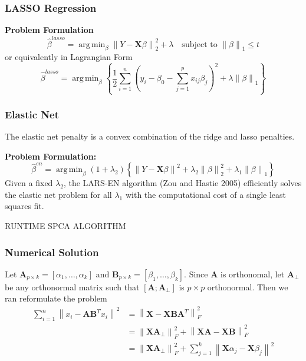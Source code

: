 \documentclass{beamer}
\theoremstyle{plain}
\theoremstyle{definition}
\newcommand{\mat}[1]{\mathbf{#1}}
\DeclareMathOperator*{\argmin}{arg\,min}
\newcommand{\norm}[1]{\left\lVert #1 \right\rVert}
\begin{document}
\begin{frame}
\frametitle{LASSO Regression}
\textbf{Problem Formulation}
$$\hat{\beta}^{lasso} = \argmin_{\beta} \norm{Y - \mat{X}\beta}_{2}^{2} + \lambda \quad \text{subject to } \norm{\beta}_{1} \leq t$$
or equivalently in Lagrangian Form
$$\hat{\beta}^{lasso} = \argmin_{\beta}\left\{\frac{1}{2}\sum_{i=1}^n (y_i - \beta_0 - \sum_{j=1}^p x_{ij}\beta_j)^2 + \lambda\norm{\beta}_{1} \right\}$$
\end{frame}

\begin{frame}
\frametitle{Elastic Net}
The elastic net penalty is a convex combination of the ridge and lasso penalties.\linebreak

\textbf{Problem Formulation:}
$$\hat{\beta}^{en} = \argmin_{\beta} (1 + \lambda_2) \left\{\norm{Y - \mat X \beta}^2 + \lambda_2 \norm{\beta}_{2}^2 + \lambda_1 \norm{\beta}_{1} \right\}$$
Given a fixed $\lambda_2$, the LARS-EN algorithm (Zou and Hastie 2005) efficiently solves the elastic net problem for all $\lambda_1$
with the computational cost of a single least squares fit.
\end{frame}

\begin{frame}
RUNTIME SPCA ALGORITHM
\end{frame}

\begin{frame}
\frametitle{Numerical Solution}
Let $\mat{A}_{p \times k} = \left[ \alpha_1, \ldots , \alpha_k\right]$ and $\mat{B}_{p \times k} = \left[ \beta_1, \ldots , \beta_k\right]$. Since $\mat A$ is orthonomal, let $\mat A_{\perp}$ be any orthonormal matrix such that $\left[ \mat A ; \mat A_{\perp} \right]$ is $p \times p$ orthonormal. Then we ran reformulate the problem
\begin{align*}
\sum_{i=1}^{n} \norm{x_i - \mat{A}\mat{B}^Tx_i}^2 & = \norm{\mat{X} - \mat{X} \mat{B} \mat{A}^T}_F^2\\
& = \norm{\mat X \mat A_{\perp}}_F^2 + \norm{\mat X \mat A - \mat X \mat B}_F^2\\
& = \norm{\mat X \mat A_{\perp}}_F^2 + \sum_{j=1}^{k} \norm{\mat X \alpha_j - \mat X \beta_j}^2
\end{align*}

\end{frame}
\end{document}
